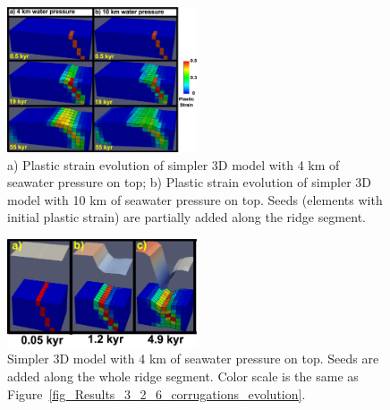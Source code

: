 \documentclass[draft,gc]{agutex}
\begin{document}
\begin{figure}[h]
\noindent\includegraphics[width=0.5\textwidth]{./Figures/fig_Discussion_simple_models_for_corrugation_mechanism.eps}
  \caption[Simpler 3D models for formation mechanism of corrugation.]{a) Plastic strain evolution of simpler 3D model with 4 km of seawater pressure on top; b) Plastic strain evolution of simpler 3D model with 10 km of seawater pressure on top. Seeds (elements with initial plastic strain) are partially added along the ridge segment.}
 \label{fig_Discussion_simple_models_for_corrugation_mechanism}
\end{figure}

\begin{figure}[h]
\noindent\includegraphics[width=0.5\textwidth]{./Figures/fig_Discussion_Observation_6_Corrugation_simplerModel_4kwaterdepth_along_ridge_seed.eps}
  \caption[Simpler 3D model with 4 km of seawater pressure on top. Seeds are added along the whole ridge segment.]{Simpler 3D model with 4 km of seawater pressure on top. Seeds are added along the whole ridge segment. Color scale is the same as Figure~\ref{fig_Results_3_2_6_corrugations_evolution}.}
 \label{fig_Discussion_Observation_6_Corrugation_simplerModel_4kwaterdepth_along_ridge_seed}
\end{figure}   

\end{document}
